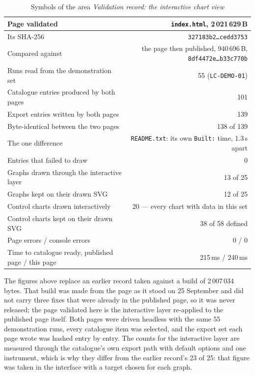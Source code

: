 \begin{center}\small
\begin{table}[H]\centering\small
\begin{tabular}{|l|r|}
\hline
Page validated & \texttt{index.html}, 2\,021\,629\,B \\ \hline
Its SHA-256 & \texttt{327183b2\ldots cedd3753} \\ \hline
Compared against & the page then published, 940\,696\,B, \texttt{8df4472e\ldots b33c770b} \\ \hline
Runs read from the demonstration set & 55 (\texttt{LC-DEMO-01}) \\ \hline
Catalogue entries produced by both pages & 101 \\ \hline
Export entries written by both pages & 139 \\ \hline
Byte-identical between the two pages & \vPASS{} 138 of 139 \\ \hline
The one difference & \texttt{README.txt}: its own \texttt{Built:} time, 1.3\,s apart \\ \hline
Entries that failed to draw & 0 \\ \hline
Graphs drawn through the interactive layer & 13 of 25 \\ \hline
Graphs kept on their drawn SVG & 12 of 25 \\ \hline
Control charts drawn interactively & 20 --- every chart with data in this set \\ \hline
Control charts kept on their drawn SVG & 38 of 58 defined \\ \hline
Page errors / console errors & 0 / 0 \\ \hline
Time to catalogue ready, published page / this page & 215\,ms / 240\,ms \\ \hline
\end{tabular}
\caption{Symbols of the area \emph{Validation record: the interactive chart view}}
\end{table}
\end{center}

\begin{notebox}[title={\textbf{This record was re-measured on 28 September 2026}}]
The figures above replace an earlier record taken against a build of 2\,007\,034 bytes. That build
was made from the page as it stood on 25 September and did not carry three fixes that were already
in the published page, so it was never released; the page validated here is the interactive layer
re-applied to the published page itself. Both pages were driven headless with the same 55
demonstration runs, every catalogue item was selected, and the export set each page wrote was hashed
entry by entry. The counts for the interactive layer are measured through the catalogue's own export
path with default options and one instrument, which is why they differ from the earlier record's
23 of 25: that figure was taken in the interface with a target chosen for each graph.
\end{notebox}


